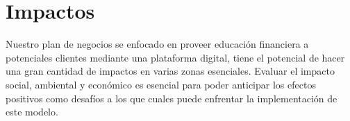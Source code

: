 \cleardoublepage 
{}
\section*{Impactos}

Nuestro plan de negocios se enfocado en proveer educación financiera a potenciales clientes mediante una plataforma digital, tiene el potencial de hacer una gran cantidad de impactos en varias zonas esenciales. Evaluar el impacto social, ambiental y económico es esencial para poder anticipar los efectos positivos como desafíos a los que cuales puede enfrentar la implementación de este modelo.







